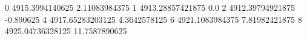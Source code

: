 0 4915.3994140625 2.11083984375
1 4913.28857421875 0.0
2 4912.39794921875 -0.890625
4 4917.65283203125 4.3642578125
6 4921.1083984375 7.81982421875
8 4925.04736328125 11.7587890625
